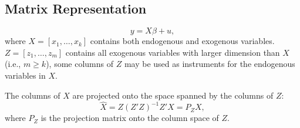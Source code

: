 \subsection*{Matrix Representation}
\[
    y = X \beta + u, 
\] 
where \( X = [x_1, \dots, x_k ] \) contains both endogenous and exogenous variables. 
\( Z = [z_1, \dots, z_m] \) contains all exogenous variables with larger dimension than \( X \) (i.e., \( m \geq k \)), some columns of \( Z \) may be used as instruments for the endogenous variables in \( X \).


The columns of \( X \) are projected onto the space spanned by the columns of \( Z \):
\[
    \hat{X} = Z (Z'Z)^{-1} Z' X = P_Z X,
\]
where \( P_Z \) is the projection matrix onto the column space of \( Z \).